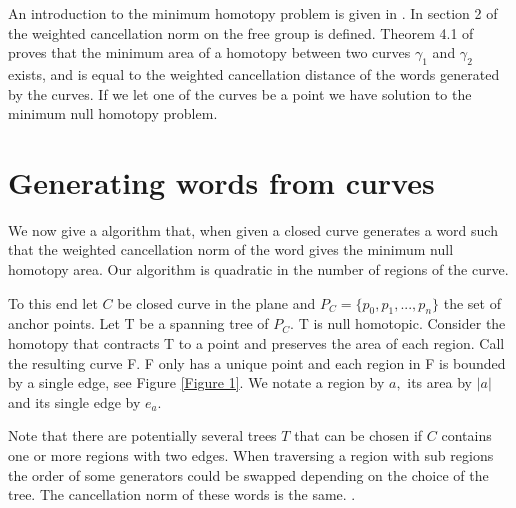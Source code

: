 \documentclass[11pt]{article}
\begin{document}
An introduction to the minimum homotopy problem is given in \cite{fkw2017}. In section 2 of ~\cite{nie2014} the weighted cancellation norm on the free group is defined. Theorem 4.1 of~\cite{nie2014} proves that the minimum area of a homotopy between two curves $\gamma_1$ and $\gamma_2$ exists, and is equal to the weighted cancellation distance of the words generated by the curves. If we let one of the curves be a point we have solution to the minimum null homotopy problem. 

\section{Generating words from curves}




We now give a algorithm that, when given a closed curve generates a word such that the weighted cancellation norm of the word gives the minimum null homotopy area. Our algorithm is quadratic in the number of regions of the curve.

To this end let $C$ be closed curve in the plane and $P_C=\{p_0,p_1,...,p_n\}$ the set of anchor points. Let T be a spanning tree of $P_C.$ T is null homotopic. Consider the homotopy that contracts T to a point and preserves the area of each region. Call the resulting curve F. F only has a unique point and each region in F is bounded by a single edge, see Figure \ref{Figure 1}. We notate a region by $a,$ its area by $|a|$ and its single edge by $e_a.$

Note that there are potentially several trees $T$ that can be chosen if $C$ contains one or more regions with two edges. When traversing a region with sub regions the order of some generators could be swapped depending on the choice of the tree. The cancellation norm of these words is the same.  .
\end{document}

